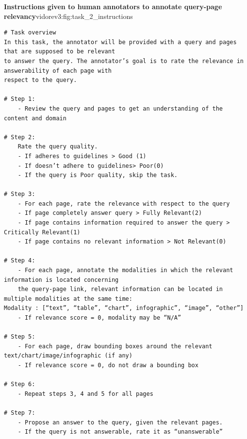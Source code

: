 
\begin{promptfigure}[blue!5]{\textbf{Instructions given to human annotators to annotate query-page relevancy}}{vidorev3:fig:task_2_instructions}
\begin{Verbatim}[breaklines=true,breakanywhere=true,fontsize=\scriptsize]
# Task overview
In this task, the annotator will be provided with a query and pages that are supposed to be relevant
to answer the query. The annotator’s goal is to rate the relevance in answerability of each page with
respect to the query.

# Step 1:
    - Review the query and pages to get an understanding of the content and domain
    
# Step 2:
    Rate the query quality. 
    - If adheres to guidelines > Good (1)
    - If doesn’t adhere to guidelines> Poor(0)
    - If the query is Poor quality, skip the task.
    
# Step 3:
    - For each page, rate the relevance with respect to the query
    - If page completely answer query > Fully Relevant(2)
    - If page contains information required to answer the query > Critically Relevant(1)
    - If page contains no relevant information > Not Relevant(0)
    
# Step 4:
    - For each page, annotate the modalities in which the relevant information is located concerning
    the query-page link, relevant information can be located in multiple modalities at the same time:
Modality : [“text”, “table”, “chart”, infographic”, “image”, “other”]
    - If relevance score = 0, modality may be “N/A”
    
# Step 5:
    - For each page, draw bounding boxes around the relevant text/chart/image/infographic (if any)
    - If relevance score = 0, do not draw a bounding box
    
# Step 6:
    - Repeat steps 3, 4 and 5 for all pages
    
# Step 7:
    - Propose an answer to the query, given the relevant pages.
    - If the query is not answerable, rate it as “unanswerable”

\end{Verbatim}
\end{promptfigure}

